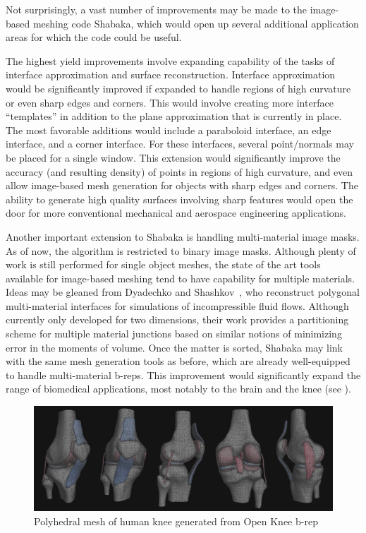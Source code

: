 Not surprisingly, a vast number of improvements may be made to the image-based meshing code Shabaka, which would open up several additional application areas for which the code could be useful.

The highest yield improvements involve expanding capability of the tasks of interface approximation and surface reconstruction. Interface approximation would be significantly improved if expanded to handle regions of high curvature or even sharp edges and corners. This would involve creating more interface ``templates'' in addition to the plane approximation that is currently in place. The most favorable additions would include a paraboloid interface, an edge interface, and a corner interface. For these interfaces, several point/normals may be placed for a single window. This extension would significantly improve the accuracy (and resulting density) of points in regions of high curvature, and even allow image-based mesh generation for objects with sharp edges and corners. The ability to generate high quality surfaces involving sharp features would open the door for more conventional mechanical and aerospace engineering applications.

Another important extension to Shabaka is handling multi-material image masks. As of now, the algorithm is restricted to binary image masks. Although plenty of work is still performed for single object meshes, the state of the art tools available for image-based meshing tend to have capability for multiple materials. Ideas may be gleaned from Dyadechko and Shashkov~\cite{dyadechko_2008}, who reconstruct polygonal multi-material interfaces for simulations of incompressible fluid flows. Although currently only developed for two dimensions, their work provides a partitioning scheme for multiple material junctions based on similar notions of minimizing error in the moments of volume. Once the matter is sorted, Shabaka may link with the same mesh generation tools as before, which are already well-equipped to handle multi-material b-reps. This improvement would significantly expand the range of biomedical applications, most notably to the brain and the knee (see ).

\begin{figure}
\centering
		\includegraphics[width=1.0\textwidth]{media/7-polyknee/fullmesh.png}
%
\caption{Polyhedral mesh of human knee generated from Open Knee b-rep~\cite{erdemir_2015}}
\label{fig:polyknee}
\end{figure}

